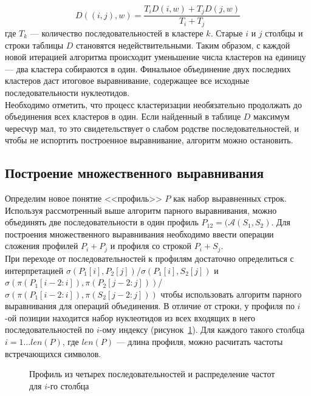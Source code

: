 \begin{equation}\label{eq:upgma}
D((i,j), w)=\frac{T_iD(i,w)+T_jD(j,w)}{T_i+T_j}
\end{equation}
где $T_k$ --- количество последовательностей в кластере $k$. Старые $i$ и $j$ столбцы и строки таблицы $D$ становятся недействительными. Таким образом, с каждой новой итерацией алгоритма происходит уменьшение числа кластеров на единицу --- два кластера собираются в один. Финальное объединение двух последних кластеров даст итоговое выравнивание, содержащее все исходные последовательности нуклеотидов. \\
\indent Необходимо отметить, что процесс кластеризации необязательно продолжать до объединения всех кластеров в один. Если найденный в таблице $D$ максимум чересчур мал, то это свидетельствует о слабом родстве последовательностей, и чтобы не испортить построенное выравнивание, алгоритм можно остановить.

\subsection[Построение множественного выравнивания]{\large Построение множественного выравнивания}
\hspace{\parindent} Определим новое понятие <<профиль>> $P$ как набор выравненных строк. Используя рассмотренный выше алгоритм парного выравнивания, можно объединять две последовательности в один профиль $P_{12}=(\mathcal{A}(S_1, S_2)$. Для построения множественного выравнивания необходимо ввести операции сложения профилей $P_i + P_j$ и профиля со строкой $P_i + S_j$.\\
\indent При переходе от последовательностей к профилям достаточно определиться с интерпретацией $\sigma(P_1[i], P_2[j])$/$\sigma(P_1[i], S_2[j])$ и $\sigma(\pi(P_1[i-2:i]), \pi(P_2[j-2:j]))$/$\sigma(\pi(P_1[i-2:i]), \pi(S_2[j-2:j]))$ чтобы использовать алгоритм парного выравнивания для операций объединения. В отличие от строки, у профиля по $i$-ой позиции находится набор нуклеотидов из всех входящих в него последовательностей по $i$-ому индексу (рисунок~\ref{ris:profile}). Для каждого такого столбца $i=1 \dots len(P)$, где $len(P)$ --- длина профиля, можно расчитать частоты встречающихся символов.

\begin{figure}[h]
	\caption{Профиль из четырех последовательностей и распределение частот для $i$-го столбца}
	\label{ris:profile}
\end{figure}

